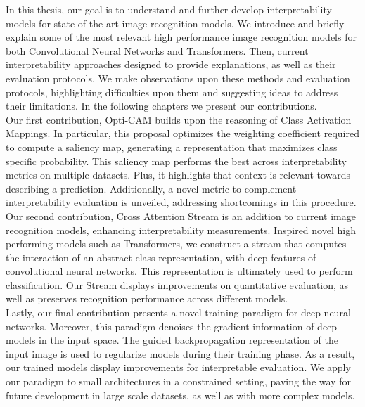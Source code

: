 
\noindent In this thesis, our goal is to understand and further develop interpretability models for 
state-of-the-art image recognition models. We introduce and briefly explain some of the most 
relevant high performance image recognition models for both Convolutional Neural Networks 
and Transformers. Then, current interpretability approaches designed to provide 
explanations, as well as their evaluation protocols. We make observations upon 
these methods and evaluation protocols, highlighting difficulties upon them and suggesting ideas 
to address their limitations. In the following chapters we present our contributions.\\

\noindent Our first contribution, Opti-CAM builds upon the reasoning of Class Activation Mappings. 
In particular, this proposal optimizes the weighting coefficient required to compute a saliency 
map, generating a representation that maximizes class specific probability.  This saliency map 
performs the best across interpretability metrics on multiple datasets.  Plus, it highlights that 
context is relevant towards describing a prediction. Additionally, a novel metric to complement 
interpretability evaluation is unveiled, addressing shortcomings in this procedure.\\

\noindent Our second contribution, Cross Attention Stream is an addition to current image 
recognition models, enhancing interpretability measurements. Inspired novel high performing models 
such as Transformers, we construct a stream that computes the interaction of an abstract class 
representation, with deep features of convolutional neural networks. This representation is 
ultimately used to perform classification. Our Stream displays improvements on quantitative 
evaluation, as well as preserves recognition performance across different models.\\

\noindent Lastly, our final contribution presents a novel training paradigm for deep neural 
networks. Moreover, this paradigm denoises the gradient information of deep models in the 
input space. The guided backpropagation representation of the input image is used to regularize 
models during their training phase. As a result, our trained models display improvements for 
interpretable evaluation. We apply our paradigm to small architectures in a constrained 
setting, paving the way for future development in large scale datasets, as well as with more 
complex models.\\

